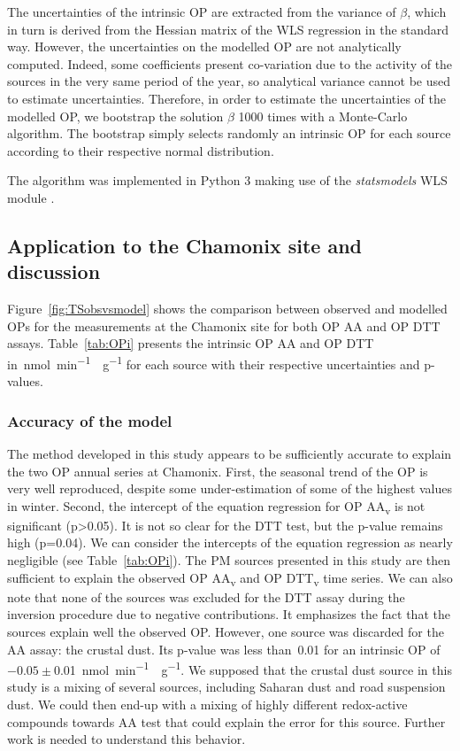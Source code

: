 \documentclass[acp, manuscript]{copernicus}
\begin{document}
The uncertainties of the intrinsic OP are extracted from the variance of
$\beta$, which in turn is derived from the Hessian matrix of the WLS
regression in the standard way. However, the uncertainties on the
modelled OP are not analytically computed. Indeed, some coefficients
present co-variation due to the activity of the sources in the very same
period of the year, so analytical variance cannot be used to estimate
uncertainties. Therefore, in order to estimate the uncertainties of the
modelled OP, we bootstrap the solution $\beta$ 1000 times with a Monte-Carlo
algorithm. The bootstrap simply selects randomly an intrinsic OP for
each source according to their respective normal distribution.

The algorithm was implemented in Python 3 making use of the
\emph{statsmodels} WLS module \citep{seabold_statsmodels:_2010}.

\subsection{Application to the Chamonix site and
discussion}\label{application-to-the-chamonix-site-and-discussion}

Figure~\ref{fig:TSobsvsmodel} shows the comparison between observed and modelled OPs for the
measurements at the Chamonix site for both OP AA and OP DTT assays.
Table~\ref{tab:OPi} presents the intrinsic OP AA and OP DTT in~\unit{nmol~min^{-1}~\mu g^{-1}} for each
source with their respective uncertainties and p-values.

\subsubsection{Accuracy of the model}\label{accuracy-of-the-model}

The method developed in this study appears to be sufficiently accurate
to explain the two OP annual series at Chamonix. First, the seasonal
trend of the OP is very well reproduced, despite some under-estimation
of some of the highest values in winter. Second, the intercept of the
equation regression for OP AA\textsubscript{v} is not significant
(p\textgreater{}0.05). It is not so clear for the DTT test, but the
p-value remains high (p=0.04). We can consider the intercepts of the
equation regression as nearly negligible (see Table~\ref{tab:OPi}). The PM sources
presented in this study are then sufficient to explain the observed OP
AA\textsubscript{v} and OP DTT\textsubscript{v} time series. We can also
note that none of the sources was excluded for the DTT assay during the
inversion procedure due to negative contributions. It emphasizes the
fact that the sources explain well the observed OP. However, one source
was discarded for the AA assay: the crustal dust. Its p-value was less
than~0.01 for an intrinsic OP of $-0.05\pm$0.01~\unit{nmol~min^{-1}~\mu g^{-1}}. We supposed that the
crustal dust source in this study is a mixing of several sources,
including Saharan dust and road suspension dust. We could then end-up
with a mixing of highly different redox-active compounds towards AA test
that could explain the error for this source. Further work is needed to
understand this behavior.
\end{document}
